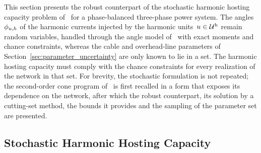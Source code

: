 This section presents the robust counterpart of the stochastic harmonic hosting capacity problem of~\cite{vanacker_shhc} for a phase-balanced three-phase power system. The angles~$\phi_{u,h}$ of the harmonic currents injected by the harmonic units~$u \in \mathcal{U}^{\text{h}}$ remain random variables, handled through the angle model of~\cite{vanacker_shhc} with exact moments and chance constraints, whereas the cable and overhead-line parameters of Section~\ref{sec:parameter_uncertainty} are only known to lie in a set. The harmonic hosting capacity must comply with the chance constraints for every realization of the network in that set. For brevity, the stochastic formulation is not repeated; the second-order cone program of~\cite{vanacker_shhc} is first recalled in a form that exposes its dependence on the network, after which the robust counterpart, its solution by a cutting-set method, the bounds it provides and the sampling of the parameter set are presented.

\subsection{Stochastic Harmonic Hosting Capacity}
\label{sec:shhc_recap}

